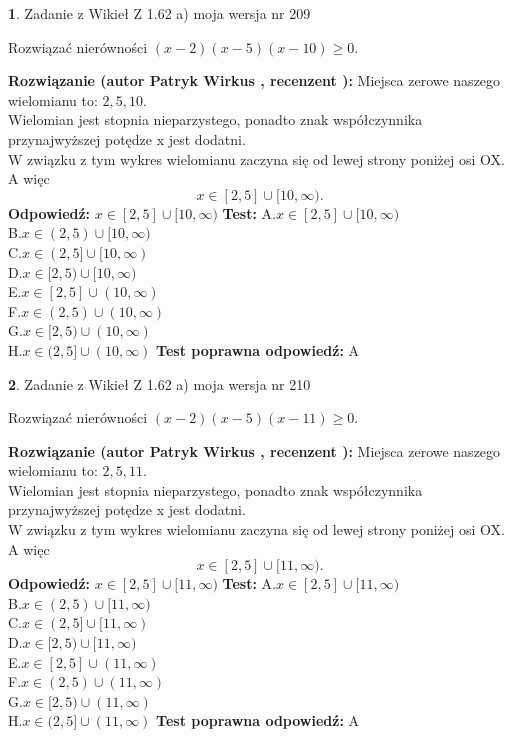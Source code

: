 \documentclass[12pt, a4paper]{article}
\theoremstyle{definition} %
\newtheorem{zad}{}
\newcommand{\zadStart}[1]{\begin{zad}#1\newline}
\newcommand{\zadStop}{\end{zad}}
\newcommand{\rozwStart}[2]{\noindent \textbf{Rozwiązanie (autor #1 , recenzent #2): }\newline}
\newcommand{\rozwStop}{\newline}
\newcommand{\odpStart}{\noindent \textbf{Odpowiedź:}\newline}
\newcommand{\odpStop}{\newline}
\newcommand{\testStart}{\noindent \textbf{Test:}\newline}
\newcommand{\testStop}{\newline}
\newcommand{\kluczStart}{\noindent \textbf{Test poprawna odpowiedź:}\newline}
\newcommand{\kluczStop}{\newline}
\begin{document}
\zadStart{Zadanie z Wikieł Z 1.62 a) moja wersja nr 209}

Rozwiązać nierówności $(x-2)(x-5)(x-10)\ge0$.
\zadStop
\rozwStart{Patryk Wirkus}{}
Miejsca zerowe naszego wielomianu to: $2, 5, 10$.\\
Wielomian jest stopnia nieparzystego, ponadto znak współczynnika przy\linebreak najwyższej potędze x jest dodatni.\\ W związku z tym wykres wielomianu zaczyna się od lewej strony poniżej osi OX. A więc $$x \in [2,5] \cup [10,\infty).$$
\rozwStop
\odpStart
$x \in [2,5] \cup [10,\infty)$
\odpStop
\testStart
A.$x \in [2,5] \cup [10,\infty)$\\
B.$x \in (2,5) \cup [10,\infty)$\\
C.$x \in (2,5] \cup [10,\infty)$\\
D.$x \in [2,5) \cup [10,\infty)$\\
E.$x \in [2,5] \cup (10,\infty)$\\
F.$x \in (2,5) \cup (10,\infty)$\\
G.$x \in [2,5) \cup (10,\infty)$\\
H.$x \in (2,5] \cup (10,\infty)$
\testStop
\kluczStart
A
\kluczStop



\zadStart{Zadanie z Wikieł Z 1.62 a) moja wersja nr 210}

Rozwiązać nierówności $(x-2)(x-5)(x-11)\ge0$.
\zadStop
\rozwStart{Patryk Wirkus}{}
Miejsca zerowe naszego wielomianu to: $2, 5, 11$.\\
Wielomian jest stopnia nieparzystego, ponadto znak współczynnika przy\linebreak najwyższej potędze x jest dodatni.\\ W związku z tym wykres wielomianu zaczyna się od lewej strony poniżej osi OX. A więc $$x \in [2,5] \cup [11,\infty).$$
\rozwStop
\odpStart
$x \in [2,5] \cup [11,\infty)$
\odpStop
\testStart
A.$x \in [2,5] \cup [11,\infty)$\\
B.$x \in (2,5) \cup [11,\infty)$\\
C.$x \in (2,5] \cup [11,\infty)$\\
D.$x \in [2,5) \cup [11,\infty)$\\
E.$x \in [2,5] \cup (11,\infty)$\\
F.$x \in (2,5) \cup (11,\infty)$\\
G.$x \in [2,5) \cup (11,\infty)$\\
H.$x \in (2,5] \cup (11,\infty)$
\testStop
\kluczStart
A
\kluczStop
\end{document}
